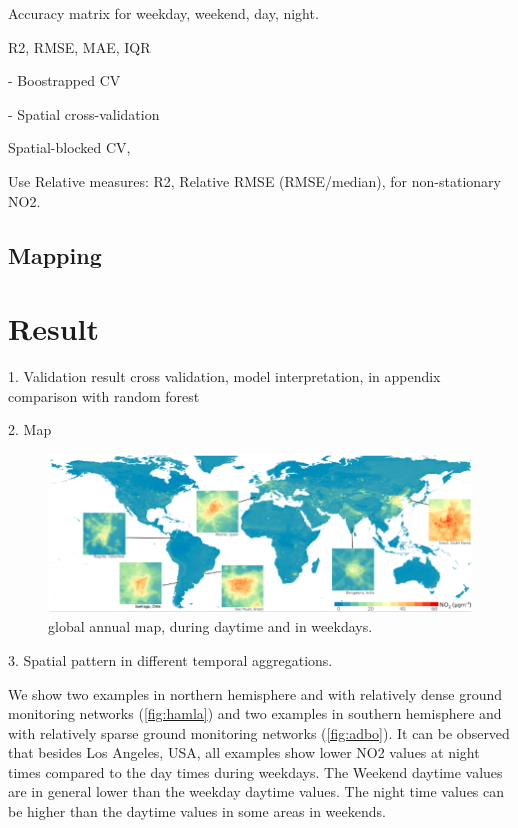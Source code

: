 \documentclass{article}
\begin{document}
Accuracy matrix for weekday, weekend, day, night.

R2, RMSE, MAE, IQR

- Boostrapped CV

- Spatial cross-validation

Spatial-blocked CV,

Use Relative measures: 
R2, Relative RMSE (RMSE/median), for non-stationary NO2. 



 

\subsection{Mapping} 

\section{Result}
1. Validation result
cross validation, model interpretation, in appendix comparison with random forest
                   
2. Map
\begin{figure}
    \centering
    \includegraphics[width=\textwidth]{fig/glomap.png}
    \caption{global annual map, during daytime and in weekdays.}
    \label{fig:map}
\end{figure}

3. Spatial pattern in different temporal aggregations.

We show two examples in northern hemisphere and with relatively dense ground monitoring networks (\cref{fig:hamla}) and two examples in southern hemisphere and with relatively sparse ground monitoring networks (\cref{fig:adbo}). It can be observed that besides Los Angeles, USA, all examples show lower NO2 values at night times compared to the day times during weekdays. The Weekend daytime values are in general lower than the weekday daytime values. The night time values can be higher than the daytime values in some areas in weekends.   
 
\end{document}
